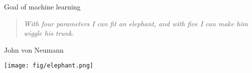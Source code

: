 
\begin{frame}{Goal of machine learning}
\begin{quote}
\textit{With four parameters I can fit an elephant, and with five I can make him wiggle his trunk}.
\end{quote}
\hspace{8cm} John von Neumann
\begin{center}
\texttt{[image: fig/elephant.png]}
\end{center}
\end{frame}